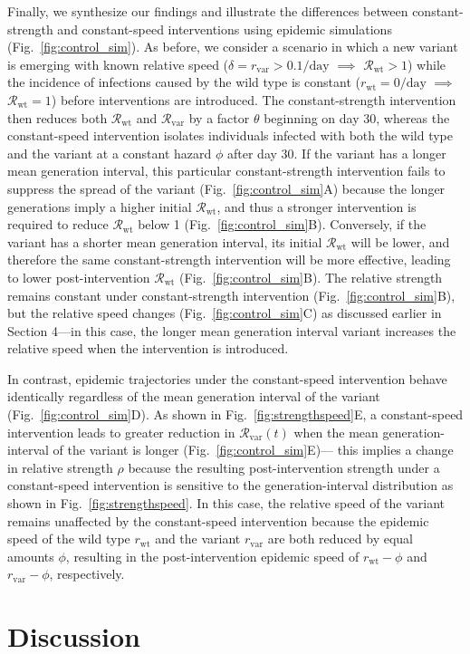 \documentclass[12pt]{article}
\newcommand{\fref}[1]{Fig.~\ref{fig:#1}}
\newcommand{\vvvar}{\mathrm{var}}
\newcommand{\wwwt}{\mathrm{wt}}
\newcommand{\rx}[1]{\ensuremath{{r}_{#1}}\xspace}
\newcommand{\rw}{\rx{\wwwt}}
\newcommand{\rv}{\rx{\vvvar}}
\newcommand{\Rx}[1]{\ensuremath{{\mathcal R}_{#1}}\xspace}
\newcommand{\Rw}{\Rx{\wwwt}}
\newcommand{\Rv}{\Rx{\vvvar}}
\newcommand{\pday}{\ensuremath{/\textrm{day}}}
\begin{document}
Finally, we synthesize our findings and illustrate the differences between constant-strength and constant-speed interventions using epidemic simulations (\fref{control_sim}).
As before, we consider a scenario in which a new variant is emerging with known relative speed ($\delta=\rv > 0.1\pday$ $\implies$ $\Rw > 1$) while the incidence of infections caused by the wild type is constant ($\rw = 0\pday$ $\implies$ $\Rw =1$) before interventions are introduced.
The constant-strength intervention then reduces both $\Rw$ and $\Rv$ by a factor $\theta$ beginning on day 30, 
whereas the constant-speed intervention isolates individuals infected with both the wild type and the variant at a constant hazard $\phi$ after day 30.
If the variant has a longer mean generation interval, this particular constant-strength intervention fails to suppress the spread of the variant (\fref{control_sim}A) because the longer generations imply a higher initial $\Rw$, and thus a stronger intervention is required to reduce $\Rw$ below 1 (\fref{control_sim}B).
Conversely, if the variant has a shorter mean generation interval, its initial $\Rw$ will be lower, and therefore the same constant-strength intervention will be more effective, leading to lower post-intervention $\Rw$ (\fref{control_sim}B).
The relative strength remains constant under constant-strength intervention (\fref{control_sim}B), but the relative speed changes (\fref{control_sim}C) as discussed earlier in Section 4---in this case, the longer mean generation interval variant increases the relative speed when the intervention is introduced.

In contrast, epidemic trajectories under the constant-speed intervention behave identically regardless of the mean generation interval of the variant (\fref{control_sim}D). 
As shown in \fref{strengthspeed}E, a constant-speed intervention leads to greater reduction in $\Rv(t)$ when the mean generation-interval of the variant is longer (\fref{control_sim}E)---
this implies a change in relative strength $\rho$ because the resulting post-intervention strength under a constant-speed intervention is sensitive to the generation-interval distribution as shown in \fref{strengthspeed}.
In this case, the relative speed of the variant remains unaffected by the constant-speed intervention because the epidemic speed of the wild type $\rw$ and the variant $\rv$ are both reduced by equal amounts $\phi$, resulting in the post-intervention epidemic speed of $\rw-\phi$ and $\rv-\phi$, respectively. 

\section{Discussion}
\end{document}
